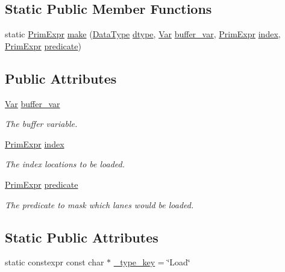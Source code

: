 \subsection*{Static Public Member Functions}
\begin{DoxyCompactItemize}
\item 
static \hyperlink{classtvm_1_1PrimExpr}{Prim\+Expr} \hyperlink{classtvm_1_1tir_1_1LoadNode_a2c16f2f89538c254b7fb4839537c65c3}{make} (\hyperlink{namespacetvm_a41918af1a1dc386388639a9d3ad06c5d}{Data\+Type} \hyperlink{classtvm_1_1PrimExprNode_a95af9234514ec5f11355db41524be7f9}{dtype}, \hyperlink{classtvm_1_1tir_1_1Var}{Var} \hyperlink{classtvm_1_1tir_1_1LoadNode_a2c69902eee069e824c822492068e6913}{buffer\+\_\+var}, \hyperlink{classtvm_1_1PrimExpr}{Prim\+Expr} \hyperlink{classtvm_1_1tir_1_1LoadNode_a0133c1a78c31b6eba24036a1f410cc1b}{index}, \hyperlink{classtvm_1_1PrimExpr}{Prim\+Expr} \hyperlink{classtvm_1_1tir_1_1LoadNode_af27e6b2dc6293dffaa93e992085be458}{predicate})
\end{DoxyCompactItemize}
\subsection*{Public Attributes}
\begin{DoxyCompactItemize}
\item 
\hyperlink{classtvm_1_1tir_1_1Var}{Var} \hyperlink{classtvm_1_1tir_1_1LoadNode_a2c69902eee069e824c822492068e6913}{buffer\+\_\+var}
\begin{DoxyCompactList}\small\item\em The buffer variable. \end{DoxyCompactList}\item 
\hyperlink{classtvm_1_1PrimExpr}{Prim\+Expr} \hyperlink{classtvm_1_1tir_1_1LoadNode_a0133c1a78c31b6eba24036a1f410cc1b}{index}
\begin{DoxyCompactList}\small\item\em The index locations to be loaded. \end{DoxyCompactList}\item 
\hyperlink{classtvm_1_1PrimExpr}{Prim\+Expr} \hyperlink{classtvm_1_1tir_1_1LoadNode_af27e6b2dc6293dffaa93e992085be458}{predicate}
\begin{DoxyCompactList}\small\item\em The predicate to mask which lanes would be loaded. \end{DoxyCompactList}\end{DoxyCompactItemize}
\subsection*{Static Public Attributes}
\begin{DoxyCompactItemize}
\item 
static constexpr const char $\ast$ \hyperlink{classtvm_1_1tir_1_1LoadNode_a4b031889ebb171c34e1f7b377df9c44e}{\+\_\+type\+\_\+key} = \char`\"{}Load\char`\"{}
\end{DoxyCompactItemize}


